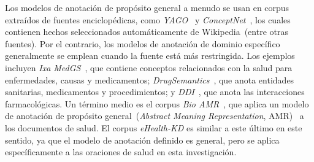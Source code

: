 \begin{table}[h!tb]
    \centering
    \caption[Comparativa de recursos lingüísticos]{Comparación entre los corpus de \textit{eHealth-KD} 2018 al 2021, con otros recursos similares con respecto a las características que definen la propuesta presentada.}
    \label{tab:corpora}
\end{table}

Los modelos de anotación de propósito general a menudo se usan en corpus extraídos de fuentes enciclopédicas, como \textit{YAGO}~\cite{suchanek2007yago} y \textit{ConceptNet}~\cite{speer2017conceptnet}, los cuales contienen hechos seleccionados automáticamente de Wikipedia~(entre otras fuentes). Por el contrario, los modelos de anotación de dominio específico generalmente se emplean cuando la fuente está más restringida. Los ejemplos incluyen \textit{Ixa MedGS}~\cite{ORONOZ2015318}, que contiene conceptos relacionados con la salud para enfermedades, causas y medicamentos; \textit{DrugSemantics}~\cite{moreno2017drugsemantics}, que anota entidades sanitarias, medicamentos y procedimientos; y \textit{DDI}~\cite{herrero2013ddi}, que anota las interacciones farmacológicas. Un término medio es el corpus \textit{Bio AMR}~\cite{bioamr}, que aplica un modelo de anotación de propósito general~(\textit{Abstract Meaning Representation}, AMR)~\cite{banarescu2013abstract} a los documentos de salud. El corpus \textit{eHealth-KD} es similar a este último en este sentido, ya que el modelo de anotación definido es general, pero se aplica específicamente a las oraciones de salud en esta investigación.

